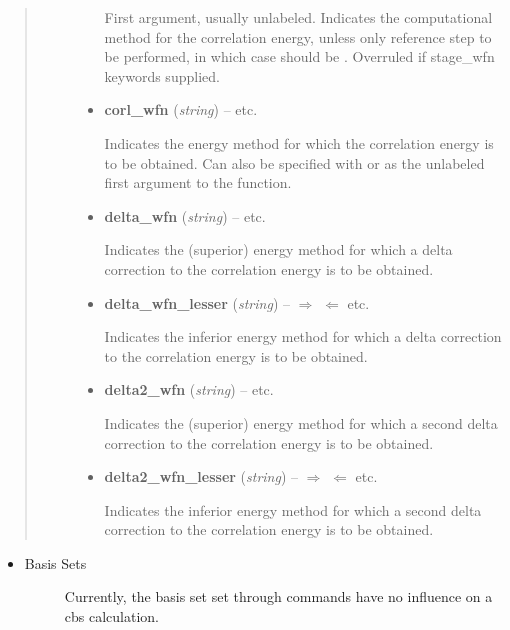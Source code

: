 \documentclass[letterpaper,10pt,english]{sphinxmanual}
\begin{document}
\begin{fulllineitems}
\begin{quote}
\begin{description}
\begin{itemize}
First argument, usually unlabeled. Indicates the computational method
for the correlation energy, unless only reference step to be performed,
in which case should be . Overruled if stage\_wfn keywords supplied.


\item {} 
\textbf{corl\_wfn} (\emph{string}) -- 
 \textbar{}\textbar{}  \textbar{}\textbar{} etc.

Indicates the energy method for which the correlation energy is to be
obtained. Can also be specified with  or as the unlabeled
first argument to the function.


\item {} 
\textbf{delta\_wfn} (\emph{string}) -- 
 \textbar{}\textbar{}  \textbar{}\textbar{} etc.

Indicates the (superior) energy method for which a delta correction
to the correlation energy is to be obtained.


\item {} 
\textbf{delta\_wfn\_lesser} (\emph{string}) -- 
$\Rightarrow$  $\Leftarrow$ \textbar{}\textbar{}  \textbar{}\textbar{} etc.

Indicates the inferior energy method for which a delta correction
to the correlation energy is to be obtained.


\item {} 
\textbf{delta2\_wfn} (\emph{string}) -- 
 \textbar{}\textbar{}  \textbar{}\textbar{} etc.

Indicates the (superior) energy method for which a second delta correction
to the correlation energy is to be obtained.


\item {} 
\textbf{delta2\_wfn\_lesser} (\emph{string}) -- 
$\Rightarrow$  $\Leftarrow$ \textbar{}\textbar{}  \textbar{}\textbar{} etc.

Indicates the inferior energy method for which a second delta correction
to the correlation energy is to be obtained.


\end{itemize}

\end{description}\end{quote}
\begin{itemize}
\item {} \begin{description}
\item[{Basis Sets}] \leavevmode
Currently, the basis set set through  commands have no influence
on a cbs calculation.


\end{description}
\end{itemize}
\end{fulllineitems}
\end{document}
